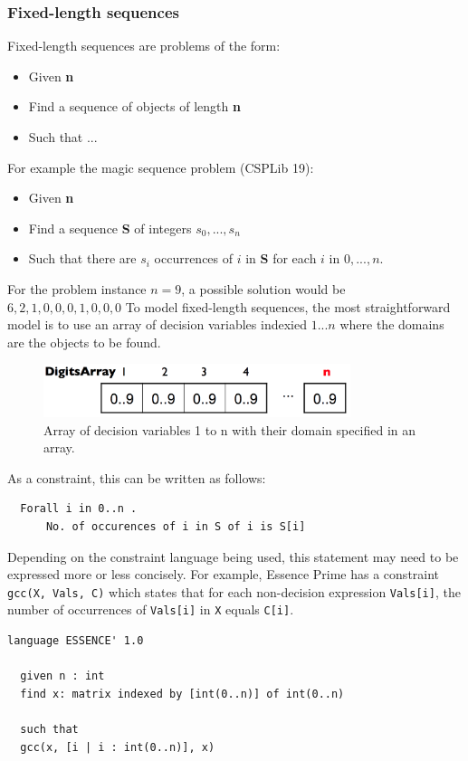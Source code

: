 \documentclass[CS4402-Notes.tex]{subfiles}
\begin{document}
\subsubsection{Fixed-length sequences}
Fixed-length sequences are problems of the form:
\begin{itemize}
\item Given \textbf{n}
\item Find a sequence of objects of length \textbf{n}
\item Such that ...
\end{itemize}
For example the magic sequence problem (CSPLib 19):
\begin{itemize}
\item Given \textbf{n}
\item Find a sequence \textbf{S} of integers $s_{0}, ..., s_{n}$
\item Such that there are $s_{i}$ occurrences of $i$ in \textbf{S} for each $i$ in $0, ..., n$.
\end{itemize}
For the problem instance $n = 9$, a possible solution would be $6, 2, 1, 0, 0, 0, 1 , 0, 0, 0$
\n
To model fixed-length sequences, the most straightforward model is to use an array of decision variables indexied $1...n$ where the domains are the objects to be found.
\begin{figure}[H]
\centering
\includegraphics[width=0.8\textwidth, keepaspectratio]{imgs/digits-array.png}
\caption{Array of decision variables 1 to n with their domain specified in an array.}
\end{figure}
\noindent
As a constraint, this can be written as follows:
\begin{lstlisting}
  Forall i in 0..n .
      No. of occurences of i in S of i is S[i]
\end{lstlisting}
Depending on the constraint language being used, this statement may need to be expressed more or less concisely. For example, Essence Prime has a constraint \texttt{gcc(X, Vals, C)} which states that for each non-decision expression \texttt{Vals[i]}, the number of occurrences of \texttt{Vals[i]} in \texttt{X} equals \texttt{C[i]}.
\begin{lstlisting}[caption={The Magic Sequence problem modelled in Essence Prime.}]
  language ESSENCE' 1.0

  given n : int
  find x: matrix indexed by [int(0..n)] of int(0..n)

  such that
  gcc(x, [i | i : int(0..n)], x)
\end{lstlisting}
\end{document}
